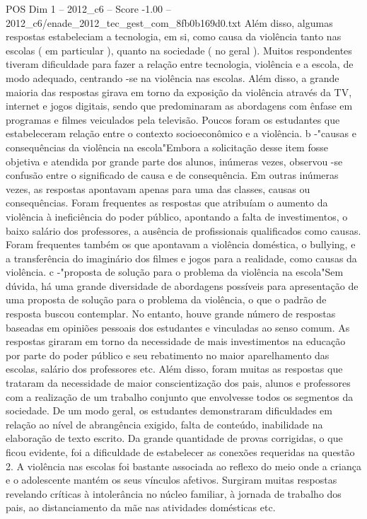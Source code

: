 \begin{textsample}{POS Dim 1 – 2012\_c6 – Score -1.00 – 2012\_c6/enade\_2012\_tec\_gest\_com\_8fb0b169d0.txt}
Além disso, algumas respostas estabeleciam a tecnologia, em si, como causa da violência tanto nas escolas ( em particular ), quanto na sociedade ( no geral ).
Muitos respondentes tiveram dificuldade para fazer a relação entre tecnologia, violência e a escola, de modo adequado, centrando -se na violência nas escolas.
Além disso, a grande maioria das respostas girava em torno da exposição da violência através da TV, internet e jogos digitais, sendo que predominaram as abordagens com ênfase em programas e filmes veiculados pela televisão.
Poucos foram os estudantes que estabeleceram relação entre o contexto socioeconômico e a violência. b -"causas e consequências da violência na escola"Embora a solicitação desse item fosse objetiva e atendida por grande parte dos alunos, inúmeras vezes, observou -se confusão entre o significado de causa e de consequência.
Em outras inúmeras vezes, as respostas apontavam apenas para uma das classes, causas ou consequências.
Foram frequentes as respostas que atribuíam o aumento da violência à ineficiência do poder público, apontando a falta de investimentos, o baixo salário dos professores, a ausência de profissionais qualificados como causas.
Foram frequentes também os que apontavam a violência doméstica, o bullying, e a transferência do imaginário dos filmes e jogos para a realidade, como causas da violência. c -"proposta de solução para o problema da violência na escola"Sem dúvida, há uma grande diversidade de abordagens possíveis para apresentação de uma proposta de solução para o problema da violência, o que o padrão de resposta buscou contemplar.
No entanto, houve grande número de respostas baseadas em opiniões pessoais dos estudantes e vinculadas ao senso comum.
As respostas giraram em torno da necessidade de mais investimentos na educação por parte do poder público e seu rebatimento no maior aparelhamento das escolas, salário dos professores etc.
Além disso, foram muitas as respostas que trataram da necessidade de maior conscientização dos pais, alunos e professores com a realização de um trabalho conjunto que envolvesse todos os segmentos da sociedade.
De um modo geral, os estudantes demonstraram dificuldades em relação ao nível de abrangência exigido, falta de conteúdo, inabilidade na elaboração de texto escrito.
Da grande quantidade de provas corrigidas, o que ficou evidente, foi a dificuldade de estabelecer as conexões requeridas na questão 2.
A violência nas escolas foi bastante associada ao reflexo do meio onde a criança e o adolescente mantém os seus vínculos afetivos.
Surgiram muitas respostas revelando críticas à intolerância no núcleo familiar, à jornada de trabalho dos pais, ao distanciamento da mãe nas atividades domésticas etc.

\end{textsample}

